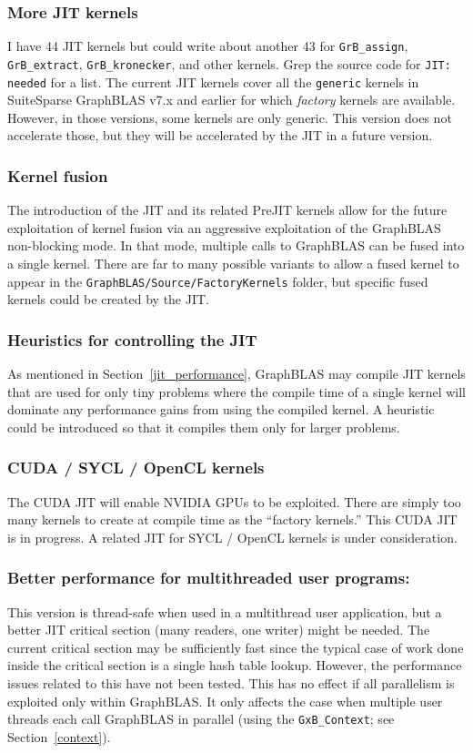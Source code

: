 \documentclass[12pt]{article}
\begin{document}
\subsubsection{More JIT kernels}
I have 44 JIT kernels but could write about another 43 for \verb'GrB_assign',
\verb'GrB_extract', \verb'GrB_kronecker', and other kernels.  Grep the source
code for \verb'JIT: needed' for a list.  The current JIT kernels cover all the
\verb'generic' kernels in SuiteSparse GraphBLAS v7.x and earlier for which {\em
factory} kernels are available.  However, in those versions, some kernels are
only generic.  This version does not accelerate those, but they will be
accelerated by the JIT in a future version.

\subsubsection{Kernel fusion}
The introduction of the JIT and its related PreJIT kernels allow for the future
exploitation of kernel fusion via an aggressive exploitation of the GraphBLAS
non-blocking mode.  In that mode, multiple calls to GraphBLAS can be fused into
a single kernel.  There are far to many possible variants to allow a fused
kernel to appear in the \verb'GraphBLAS/Source/FactoryKernels' folder, but
specific fused kernels could be created by the JIT.

\subsubsection{Heuristics for controlling the JIT}
As mentioned in Section~\ref{jit_performance}, GraphBLAS may compile JIT
kernels that are used for only tiny problems where the compile time of a single
kernel will dominate any performance gains from using the compiled kernel.  A
heuristic could be introduced so that it compiles them only for larger
problems.

\subsubsection{CUDA / SYCL / OpenCL kernels}
The CUDA JIT will enable NVIDIA GPUs to be exploited.  There are simply too
many kernels to create at compile time as the ``factory kernels.''  This CUDA
JIT is in progress.  A related JIT for SYCL / OpenCL kernels is under
consideration.

\subsubsection{Better performance for multithreaded user programs:}
This version is thread-safe when used in a multithread user application, but a
better JIT critical section (many readers, one writer) might be needed.  The
current critical section may be sufficiently fast since the typical case of
work done inside the critical section is a single hash table lookup.  However,
the performance issues related to this have not been tested.  This has no
effect if all parallelism is exploited only within GraphBLAS.  It only
affects the case when multiple user threads each call GraphBLAS in parallel
(using the \verb'GxB_Context'; see Section~\ref{context}).
\end{document}
